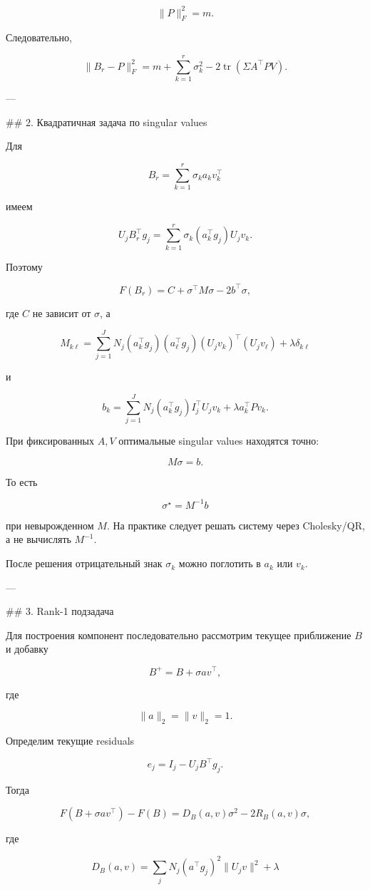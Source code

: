 \[
\|P\|_F^2=m.
\]

Следовательно,

\[
\boxed{
\|B_r-P\|_F^2
=
m+
\sum_{k=1}^r\sigma_k^2
-
2\operatorname{tr}
\left(
\Sigma A^\top PV
\right).
}
\]

---

## 2. Квадратичная задача по singular values

Для

\[
B_r=
\sum_{k=1}^r\sigma_ka_kv_k^\top
\]

имеем

\[
U_jB_r^\top g_j
=
\sum_{k=1}^{r}
\sigma_k(a_k^\top g_j)U_jv_k.
\]

Поэтому

\[
F(B_r)
=
C+
\sigma^\top M\sigma
-
2b^\top\sigma,
\]

где \(C\) не зависит от \(\sigma\), а

\[
\boxed{
M_{k\ell}
=
\sum_{j=1}^{J}
N_j
(a_k^\top g_j)
(a_\ell^\top g_j)
(U_jv_k)^\top(U_jv_\ell)
+
\lambda\delta_{k\ell}
}
\]

и

\[
\boxed{
b_k
=
\sum_{j=1}^{J}
N_j
(a_k^\top g_j)
I_j^\top U_jv_k
+
\lambda a_k^\top Pv_k.
}
\]

При фиксированных \(A,V\) оптимальные singular values находятся точно:

\[
\boxed{
M\sigma=b.
}
\]

То есть

\[
\sigma^\star=M^{-1}b
\]

при невырожденном \(M\). На практике следует решать систему через Cholesky/QR, а не вычислять \(M^{-1}\).

После решения отрицательный знак \(\sigma_k\) можно поглотить в \(a_k\) или \(v_k\).

---

## 3. Rank-1 подзадача

Для построения компонент последовательно рассмотрим текущее приближение \(B\) и добавку

\[
B^+=B+\sigma av^\top,
\]

где

\[
\|a\|_2=\|v\|_2=1.
\]

Определим текущие residuals

\[
e_j
=
I_j-U_jB^\top g_j.
\]

Тогда

\[
F(B+\sigma av^\top)-F(B)
=
D_B(a,v)\sigma^2
-
2R_B(a,v)\sigma,
\]

где

\[
\boxed{
D_B(a,v)
=
\sum_j
N_j
(a^\top g_j)^2
\|U_jv\|^2
+
\lambda
}
\]

